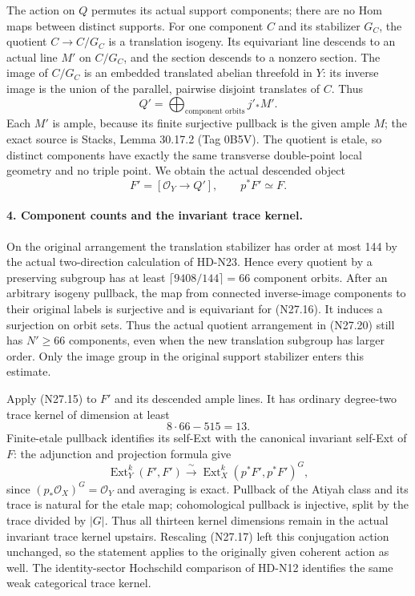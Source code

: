 The action on $Q$ permutes its actual support components;
there are no Hom maps between distinct supports.
For one component $C$ and its stabilizer $G_C$, the
quotient $C\to C/G_C$ is a translation isogeny. Its
equivariant line descends to an actual line $M'$ on
$C/G_C$, and the section descends to a nonzero section.
The image of $C/G_C$ is an embedded translated abelian
threefold in $Y$: its inverse image is the union of the
parallel, pairwise disjoint translates of $C$. Thus
\[
                     Q'=\bigoplus_{\text{component orbits}}
                                  j'_*M'.                 \tag{N27.20}
\]
Each $M'$ is ample, because its finite surjective pullback
is the given ample $M$; the exact source is Stacks,
Lemma 30.17.2 (Tag 0B5V). The quotient is etale, so distinct
components have exactly the same transverse double-point
local geometry and no triple point. We obtain the actual
descended object
\[
                    F'=[\mathcal O_Y\longrightarrow Q'],
                               \qquad p^*F'\simeq F.      \tag{N27.21}
\]

\paragraph{4. Component counts and the invariant trace kernel.}
On the original arrangement the translation stabilizer has
order at most 144 by the actual two-direction calculation
of HD-N23. Hence every quotient by a preserving subgroup
has at least $\lceil9408/144\rceil=66$ component orbits.
After an arbitrary isogeny pullback, the map from connected
inverse-image components to their original labels is
surjective and is equivariant for (N27.16). It induces a
surjection on orbit sets. Thus the actual quotient
arrangement in (N27.20) still has $N'\ge66$ components,
even when the new translation subgroup has larger order.
Only the image group in the original support stabilizer
enters this estimate.

Apply (N27.15) to $F'$ and its descended ample lines.
It has ordinary degree-two trace kernel of dimension at least
\[
                         8\cdot66-515=13.                 \tag{N27.22}
\]
Finite-etale pullback identifies its self-Ext with the
canonical invariant self-Ext of $F$: the adjunction and
projection formula give
\[
 \operatorname{Ext}^k_Y(F',F')
           \xrightarrow{\ \sim\ }
                    \operatorname{Ext}^k_X(p^*F',p^*F')^G,
                                                               \tag{N27.23}
\]
since $(p_*\mathcal O_X)^G=\mathcal O_Y$ and averaging
is exact. Pullback of the Atiyah class and its trace is
natural for the etale map; cohomological pullback is
injective, split by the trace divided by $|G|$.
Thus all thirteen kernel dimensions remain in the actual
invariant trace kernel upstairs. Rescaling (N27.17) left
this conjugation action unchanged, so the statement applies
to the originally given coherent action as well.
The identity-sector Hochschild comparison of HD-N12
identifies the same weak categorical trace kernel.

